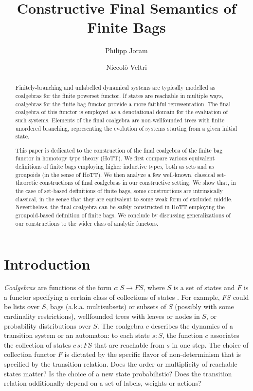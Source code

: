 \documentclass[final,a4paper,USenglish,cleveref]{lipics-v2021}
\title{Constructive Final Semantics of Finite Bags}
\author{Philipp Joram}%
  {Department of Software Science, Tallinn University of Technology, Estonia}
  {philipp@cs.ioc.ee}%
  {https://orcid.org/0000-0002-0448-7907}%
  {}
\author{Niccol{\`o} Veltri}%
  {Department of Software Science, Tallinn University of Technology, Estonia}
  {niccolo@cs.ioc.ee}%
  {https://orcid.org/0000-0002-7230-3436}%
  {}
\begin{document}
\maketitle

\begin{abstract}
  Finitely-branching and unlabelled dynamical systems are typically modelled as coalgebras for the finite powerset functor.
  If states are reachable in multiple ways, coalgebras for the finite bag functor provide a more faithful representation.
  The final coalgebra of this functor is employed as a denotational domain for the evaluation of such systems.
  Elements of the final coalgebra are non-wellfounded trees with finite unordered branching,
  representing the evolution of systems starting from a given initial state.

  This paper is dedicated to the construction of the final coalgebra of the finite bag functor in homotopy type theory (HoTT).
  We first compare various equivalent definitions of finite bags employing higher inductive types, both as sets and as groupoids (in the sense of HoTT).
  We then analyze a few well-known, classical set-theoretic constructions of final coalgebras in our constructive setting.
  We show that, in the case of set-based definitions of finite bags,
  some constructions are intrinsically classical, in the sense that they are equivalent to some weak form of excluded middle.
  Nevertheless, the final coalgebra can be safely constructed in HoTT employing the groupoid-based definition of finite bags.
  We conclude by discussing generalizations of our constructions to the wider class of analytic functors.

\end{abstract}

\setcounter{tocdepth}{2}

\section{Introduction}

\emph{Coalgebras} are functions of the form $c : S \to F S$, where $S$ is a set of states and $F$ is a functor specifying a certain class of collections of states \cite{Rutten2000,Jacobs2016}. For example, $F S$ could be lists over $S$, bags (a.k.a. multisubsets) or subsets of $S$ (possibly with some cardinality restrictions), wellfounded trees with leaves or nodes in $S$, or probability distributions over $S$. The coalgebra $c$ describes the dynamics of a transition system or an automaton: to each state $s : S$, the function $c$ associates the collection of states $c \,s : F S$ that are reachable from $s$ in one step. The choice of collection functor $F$ is dictated by the specific flavor of non-determinism that is specified by the transition relation. Does the order or multiplicity of reachable states matter? Is the choice of a new state probabilistic? Does the transition relation additionally depend on a set of labels, weights or actions?
\end{document}
